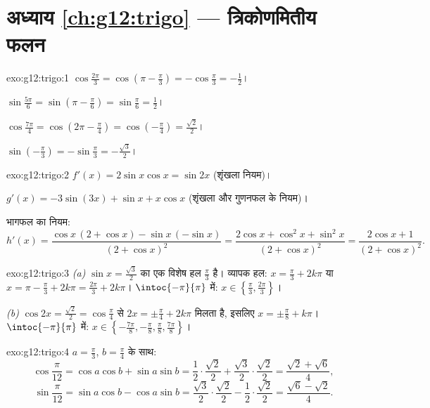 \section*{अध्याय \ref{ch:g12:trigo} --- त्रिकोणमितीय फलन}

\begin{solution}{exo:g12:trigo:1}
$\cos\frac{2\pi}{3} = \cos\left(\pi - \frac\pi3\right) = -\cos\frac\pi3
= -\frac12$।

$\sin\frac{5\pi}{6} = \sin\left(\pi - \frac\pi6\right) = \sin\frac\pi6
= \frac12$।

$\cos\frac{7\pi}{4} = \cos\left(2\pi - \frac{\pi}{4}\right)
= \cos\left(-\frac\pi4\right) = \frac{\sqrt2}{2}$।

$\sin\left(-\frac\pi3\right) = -\sin\frac\pi3 = -\frac{\sqrt3}{2}$।
\end{solution}

\begin{solution}{exo:g12:trigo:2}
$f'(x) = 2\sin x\cos x = \sin 2x$ (शृंखला नियम)।

$g'(x) = -3\sin(3x) + \sin x + x\cos x$ (शृंखला और गुणनफल के नियम)।

भागफल का नियम:
\[
h'(x) = \frac{\cos x\,(2 + \cos x) - \sin x\,(-\sin x)}{(2+\cos x)^2}
= \frac{2\cos x + \cos^2 x + \sin^2 x}{(2+\cos x)^2}
= \frac{2\cos x + 1}{(2+\cos x)^2}.
\]
\end{solution}

\begin{solution}{exo:g12:trigo:3}
\emph{(a)} $\sin x = \frac{\sqrt3}{2}$ का एक विशेष हल $\frac\pi3$ है। व्यापक हल: $x = \frac\pi3 + 2k\pi$ या $x = \pi - \frac\pi3 + 2k\pi = \frac{2\pi}{3} + 2k\pi$। $\intoc{-\pi}{\pi}$ में:
$x \in \left\{\frac\pi3, \frac{2\pi}{3}\right\}$।

\emph{(b)} $\cos 2x = \frac{\sqrt2}{2} = \cos\frac\pi4$ से $2x = \pm\frac\pi4 + 2k\pi$ मिलता है, इसलिए $x = \pm\frac\pi8 + k\pi$। $\intoc{-\pi}{\pi}$ में: $x \in \left\{-\frac{7\pi}{8}, -\frac\pi8, \frac\pi8, \frac{7\pi}{8}\right\}$।
\end{solution}

\begin{solution}{exo:g12:trigo:4}
$a = \frac\pi3$, $b = \frac\pi4$ के साथ:
\[
\cos\frac{\pi}{12} = \cos a\cos b + \sin a \sin b
= \frac12\cdot\frac{\sqrt2}{2} + \frac{\sqrt3}{2}\cdot\frac{\sqrt2}{2}
= \frac{\sqrt2 + \sqrt6}{4},
\]
\[
\sin\frac{\pi}{12} = \sin a\cos b - \cos a \sin b
= \frac{\sqrt3}{2}\cdot\frac{\sqrt2}{2} - \frac12\cdot\frac{\sqrt2}{2}
= \frac{\sqrt6 - \sqrt2}{4}.
\]
\end{solution}


